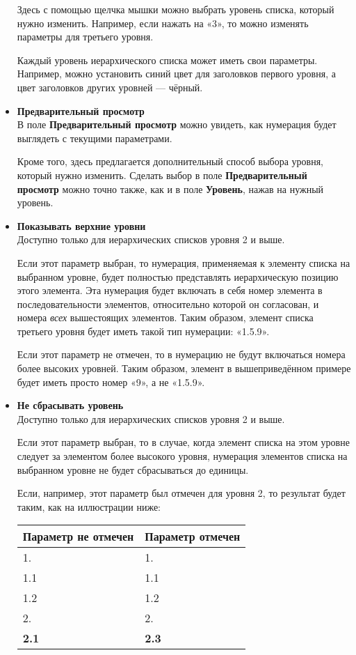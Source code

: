 \documentclass[a4paper,10pt]{article}
\begin{document}
\begin{itemize}
Здесь с помощью щелчка мышки можно выбрать уровень списка, который нужно изменить. Например, если нажать на «3», то можно изменять параметры для третьего уровня.

Каждый уровень иерархического списка может иметь свои параметры. Например, можно установить синий цвет для заголовков первого уровня, а цвет заголовков других уровней --- чёрный.
\item \textbf{Предварительный просмотр}\\
В поле \textbf{Предварительный просмотр} можно увидеть, как нумерация будет выглядеть с текущими параметрами.

Кроме того, здесь предлагается дополнительный способ выбора уровня, который нужно изменить. Сделать выбор в поле \textbf{Предварительный просмотр} можно точно также, как и в поле \textbf{Уровень}, нажав на нужный уровень.
\item \textbf{Показывать верхние уровни}\\
Доступно только для иерархических списков уровня 2 и выше.

Если этот параметр выбран, то нумерация, применяемая к элементу списка на выбранном уровне, будет полностью представлять иерархическую позицию этого элемента. Эта нумерация будет включать в себя номер элемента в последовательности элементов, относительно которой он согласован, и номера \textit{всех} вышестоящих элементов. Таким образом, элемент списка третьего уровня будет иметь такой тип нумерации: «1.5.9».

Если этот параметр не отмечен, то в нумерацию не будут включаться номера более высоких уровней. Таким образом, элемент в вышеприведённом примере будет иметь просто номер «9», а не «1.5.9».
\item \textbf{Не сбрасывать уровень}\\
Доступно только для иерархических списков уровня 2 и выше. 

Если этот параметр выбран, то в случае, когда элемент списка на этом уровне следует за элементом более высокого уровня, нумерация элементов списка на выбранном уровне не будет сбрасываться до единицы.

Если, например, этот параметр был отмечен для уровня 2, то результат будет таким, как на иллюстрации ниже:

\begin{center}
\begin{tabular}{  m{4cm}  m{10cm}  }
 \textbf{Параметр не отмечен} & \textbf{Параметр отмечен} \\ 
 \hline
  1. & 1.\\
  1.1 & 1.1\\
  1.2 & 1.2\\
  2. & 2.\\
  \textbf{2.1} & \textbf{2.3}\\
\end{tabular}
\end{center}
 

\end{itemize}
\end{document}
